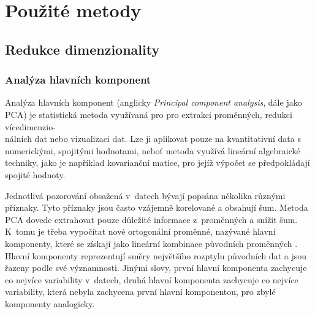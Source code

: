 \chapter{Použité metody}




\section{Redukce dimenzionality} %

\subsection{Analýza hlavních komponent}

Analýza hlavních komponent (anglicky \emph{Principal component analysis}, dále jako PCA) je statistická metoda využívaná pro pro extrakci proměnných, redukci vícedimenzio-\\nálních dat nebo vizualizaci dat. Lze ji aplikovat pouze na kvantitativní data s numerickými, spojitými hodnotami, neboť metoda využívá lineární algebraické techniky, jako je například kovarianční matice, pro jejíž výpočet se předpokládají spojité hodnoty. 

Jednotlivá pozorování obsažená v~datech bývají popsána několika různými příznaky. Tyto příznaky jsou často vzájemně korelované a obsahují šum. Metoda PCA dovede extrahovat pouze důležité informace z~proměnných a snížit šum. K~tomu je třeba vypočítat nové ortogonální proměnné, nazývané hlavní komponenty, které se získají jako lineární kombinace původních proměnných \cite{bib:PCA1}. Hlavní komponenty reprezentují směry největšího rozptylu původních dat a jsou řazeny podle své významnosti. Jinými slovy, první hlavní komponenta zachycuje co nejvíce variability v~datech, druhá hlavní komponenta zachycuje co nejvíce variability, která nebyla zachycena první hlavní komponentou, pro zbylé komponenty analogicky. \cite{bib:PCA3}

